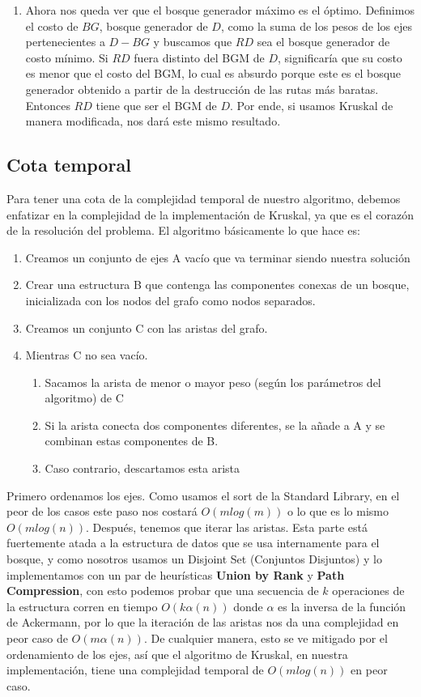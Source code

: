 \begin{enumerate}
	\item Ahora nos queda ver que el bosque generador máximo es el óptimo. Definimos el costo de $BG$, bosque generador de $D$, como la suma de los pesos de los ejes pertenecientes a $D - BG$ y buscamos que $RD$ sea el bosque generador de costo mínimo. Si $RD$ fuera distinto del BGM de $D$, significaría que su costo es menor que el costo del BGM, lo cual es absurdo porque este es el bosque generador obtenido a partir de la destrucción de las rutas más baratas. Entonces $RD$ tiene que ser el BGM de $D$. Por ende, si usamos Kruskal de manera modificada, nos dará este mismo resultado.
\end{enumerate}

\subsection{Cota temporal}

Para tener una cota de la complejidad temporal de nuestro algoritmo, debemos enfatizar en la complejidad de la implementación de Kruskal, ya que es el corazón de la resolución del problema. El algoritmo básicamente lo que hace es:
\begin{enumerate}
	\item Creamos un conjunto de ejes A vacío que va terminar siendo nuestra solución
	\item Crear una estructura B que contenga las componentes conexas de un bosque, inicializada con los nodos del grafo como nodos separados.
	\item Creamos un conjunto C con las aristas del grafo.
	\item Mientras C no sea vacío.
	\begin{enumerate}
	\item Sacamos la arista de menor o mayor peso (según los parámetros del algoritmo) de C
	\item Si la arista conecta dos componentes diferentes, se la añade a A y se combinan estas componentes de B.
	\item Caso contrario, descartamos esta arista
	\end{enumerate}
\end{enumerate}
 
Primero ordenamos los ejes. Como usamos el sort de la Standard Library, en el peor de los casos este paso nos costará $O(mlog(m))$ o lo que es lo mismo $O(mlog(n))$. Después, tenemos que iterar las aristas. Esta parte está fuertemente atada a la estructura de datos que se usa internamente para el bosque, y como nosotros usamos un Disjoint Set (Conjuntos Disjuntos) y lo implementamos con un par de heurísticas \textbf{Union by Rank} y \textbf{Path Compression}, con esto podemos probar que una secuencia de $k$ operaciones de la estructura corren en tiempo $O(k\alpha (n))$ donde $\alpha$ es la inversa de la función de Ackermann, por lo que la iteración de las aristas nos da una complejidad en peor caso de $O(m\alpha (n))$. De cualquier manera, esto se ve mitigado por el ordenamiento de los ejes, así que el algoritmo de Kruskal, en nuestra implementación, tiene una complejidad temporal de $O(mlog(n))$ en peor caso. 
 
